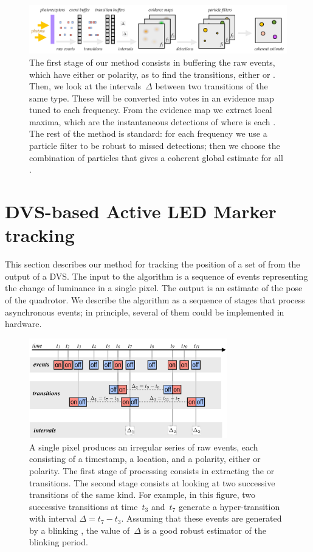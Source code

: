 \begin{figure}
\centering{}\includegraphics[width=18cm]{figures/slides/overall2}\caption{The first stage of our method consists in buffering the raw events,
which have either \pP or \pN polarity, as to find the transitions,
either \pPN or \pNP. Then, we look at the intervals~$\Delta$ between
two transitions of the same type. These will be converted into votes
in an evidence map tuned to each frequency. From the evidence map
we extract local maxima, which are the instantaneous detections of
where is each \ALM. The rest of the method is standard: for each
frequency we use a particle filter to be robust to missed detections;
then we choose the combination of particles that gives a coherent
global estimate for all \ALMs.}
\end{figure}


\vfill\pagebreak


\section{DVS-based Active LED Marker tracking }

This section describes our method for tracking the position of a set
of \ALMs from the output of a DVS. The input to the algorithm is
a sequence of events representing the change of luminance in a single
pixel. The output is an estimate of the pose of the quadrotor. We
describe the algorithm as a sequence of stages that process asynchronous
events; in principle, several of them could be implemented in hardware.

\begin{figure}[H]
\includegraphics[width=8.6cm]{figures/slides/stages3}

\caption{\label{fig:A-single-pixel}A single pixel produces an irregular series
of raw events, each consisting of a timestamp, a location, and a polarity,
either \pP or \pN polarity. The first stage of processing consists
in extracting the \pPN or \pNP transitions. The second stage consists
at looking at two successive transitions of the same kind. For example,
in this figure, two successive \pPN transitions at time~$t_{3}$
and~$t_{7}$ generate a hyper-transition with interval $\Delta=t_{7}-t_{3}$.
Assuming that these events are generated by a blinking \ALM, the
value of~$\Delta$ is a good robust estimator of the blinking period.}
\end{figure}



